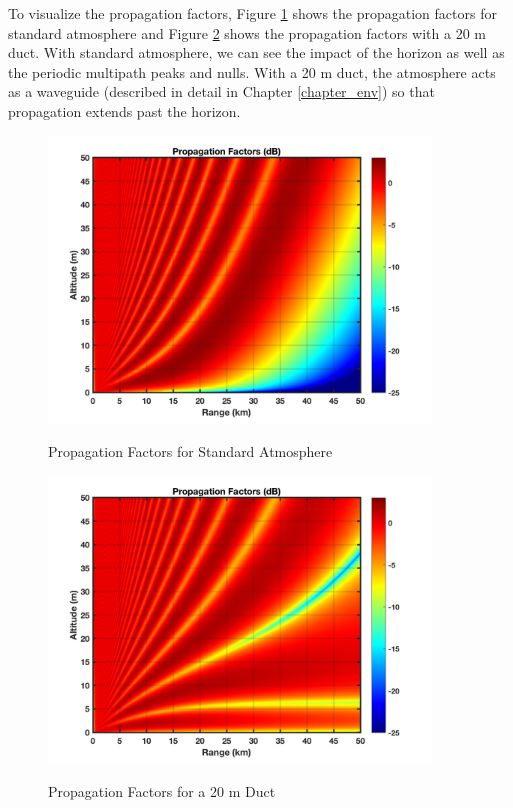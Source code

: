 To visualize the propagation factors, Figure \ref{intro_fig:1a} shows the propagation factors for standard atmosphere and Figure \ref{intro_fig:1b} shows the propagation factors with a 20 m duct. With standard atmosphere, we can see the impact of the horizon as well as the periodic multipath peaks and nulls. With a 20 m duct, the atmosphere acts as a waveguide (described in detail in Chapter \ref{chapter_env}) so that propagation extends past the horizon.
  \begin{figure}[H]
  \begin{center}
\includegraphics[width=4in]{../media/multistatic/std_atmos_pf.png}
  \end{center}
  \renewcommand{\baselinestretch}{1} \small\normalsize
  \begin{quote}
    \caption[Propagation Factors for Standard Atmosphere]{Propagation Factors for Standard Atmosphere \label{intro_fig:1a}}
  \end{quote}
\end{figure}
\renewcommand{\baselinestretch}{2} \small\normalsize

\begin{figure}[H]
  \begin{center}
\includegraphics[width=4in]{../media/multistatic/20m_duct_pf.png}
  \end{center}
  \renewcommand{\baselinestretch}{1} \small\normalsize
  \begin{quote}
    \caption[Propagation Factors for a 20 m Duct]{Propagation Factors for a 20 m Duct \label{intro_fig:1b}}
  \end{quote}
\end{figure}
\renewcommand{\baselinestretch}{2} \small\normalsize

